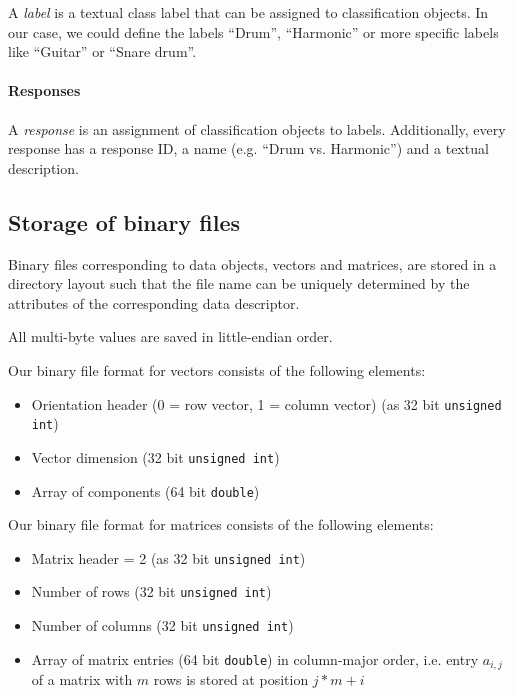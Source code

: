 A \emph{label} is a textual class label that can be assigned to classification
objects. In our case, we could define the labels ``Drum'', ``Harmonic'' or more
specific labels like ``Guitar'' or ``Snare drum''.


\paragraph{Responses}

A \emph{response} is an assignment of classification objects to labels.
Additionally, every response has a response ID, a name (e.g. ``Drum vs.
Harmonic'') and a textual description.


\subsection{Storage of binary files}
\label{subsec:FileFormats}

Binary files corresponding to data objects, \ie vectors and matrices, are
stored in a directory layout such that the file name can be uniquely determined
by the attributes of the corresponding data descriptor.

All multi-byte values are saved in little-endian order.

Our binary file format for vectors consists of the following elements:
\begin{itemize}
    \item Orientation header (0 = row vector, 1 = column vector) (as 32 bit {\tt unsigned int})
    \item Vector dimension (32 bit {\tt unsigned int})
    \item Array of components (64 bit {\tt double})
\end{itemize}

Our binary file format for matrices consists of the following elements:
\begin{itemize}
    \item Matrix header = 2 (as 32 bit {\tt unsigned int})
    \item Number of rows (32 bit {\tt unsigned int})
    \item Number of columns (32 bit {\tt unsigned int})
    \item Array of matrix entries (64 bit {\tt double}) in column-major order,
      i.e. entry $a_{i,j}$ of a matrix with $m$ rows is stored at position $j *
      m + i$
\end{itemize}



